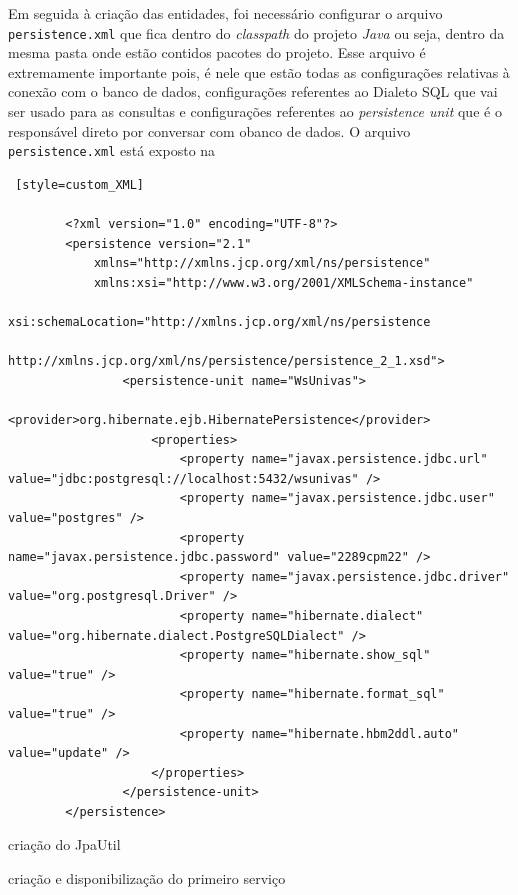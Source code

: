			\par Em seguida à criação das entidades, foi necessário configurar o arquivo
		\texttt{persistence.xml} que fica dentro do \textit{classpath} do projeto
		\textit{Java} ou seja, dentro da mesma pasta onde estão contidos pacotes do
		projeto. Esse arquivo é extremamente importante pois, é nele que estão todas
		as configurações relativas à conexão com o banco de dados, configurações
		referentes ao Dialeto SQL que vai ser usado para as consultas e configurações
		referentes ao \textit{persistence unit} que é o responsável direto por
		conversar com obanco de dados. O arquivo \texttt{persistence.xml} está exposto
		na 
	
  \begin{lstlisting} [style=custom_XML]

		<?xml version="1.0" encoding="UTF-8"?>
		<persistence version="2.1"
			xmlns="http://xmlns.jcp.org/xml/ns/persistence" 
			xmlns:xsi="http://www.w3.org/2001/XMLSchema-instance"
			xsi:schemaLocation="http://xmlns.jcp.org/xml/ns/persistence
			http://xmlns.jcp.org/xml/ns/persistence/persistence_2_1.xsd">
				<persistence-unit name="WsUnivas">
					<provider>org.hibernate.ejb.HibernatePersistence</provider>
					<properties>
						<property name="javax.persistence.jdbc.url" value="jdbc:postgresql://localhost:5432/wsunivas" />
						<property name="javax.persistence.jdbc.user" value="postgres" />
						<property name="javax.persistence.jdbc.password" value="2289cpm22" />
						<property name="javax.persistence.jdbc.driver" value="org.postgresql.Driver" />
						<property name="hibernate.dialect" value="org.hibernate.dialect.PostgreSQLDialect" />
						<property name="hibernate.show_sql" value="true" />
						<property name="hibernate.format_sql" value="true" />
						<property name="hibernate.hbm2ddl.auto" value="update" />
					</properties>
				</persistence-unit>
		</persistence>
	\end{lstlisting}
		
		
		\par criação do JpaUtil

		\par criação e disponibilização do primeiro serviço
